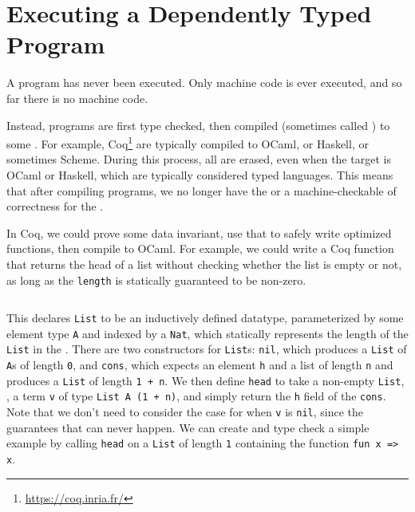 \section{Executing a Dependently Typed Program}
A  program has never been executed.
Only machine code is ever executed, and so far there is no  machine code.

Instead,  programs are first type checked, then compiled
(sometimes called ) to some .
For example, Coq\footnote{\url{https://coq.inria.fr/}}  are
typically compiled to OCaml, or Haskell, or sometimes Scheme.
During this process, all  are erased, even when the target is OCaml
or Haskell, which are typically considered typed languages.
This means that after compiling  programs, we no longer
have the  or a machine-checkable  of
correctness for the .

In Coq, we could prove some data invariant, use that to safely write optimized
functions, then compile to OCaml.
For example, we could write a Coq function that returns the head of a list
without checking whether the list is empty or not, as long as the
\texttt{length} is statically guaranteed to be non-zero.
%
\inputminted[xleftmargin=1em,firstline=4,lastline=14,firstnumber=1]{coq}{chapters/intro/head-eg.v}%
%
\noindent This declares \texttt{List} to be an inductively defined datatype,
parameterized by some element type \texttt{A} and indexed by a
\texttt{Nat}, which statically represents the length of the
\texttt{List} in the .
There are two constructors for \texttt{List}s: \texttt{nil},
which produces a \texttt{List} of \texttt{A}s of length
\texttt{0}, and \texttt{cons}, which expects an element
\texttt{h} and a list of length \texttt{n} and produces a
\texttt{List} of length \texttt{1 + n}.
We then define \texttt{head} to take a non-empty
\texttt{List}, \ie, a term \texttt{v} of type
\texttt{List A (1 + n)}, and simply return the \texttt{h}
field of the \texttt{cons}. Note that we don't need to consider the
case for when \texttt{v} is \texttt{nil}, since the
 guarantees that can never happen.
We can create and type check a simple example by calling \texttt{head}
on a \texttt{List} of length \texttt{1} containing the
function \texttt{fun x => x}.

